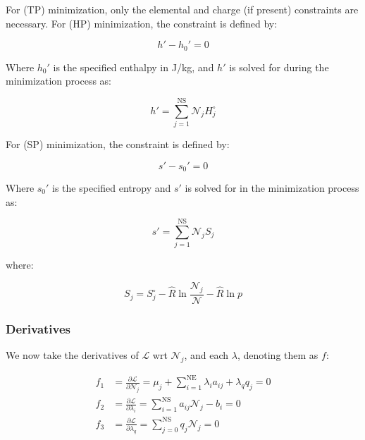 \documentclass[10pt]{article}
\begin{document}
\begin{flushleft}
For (TP) minimization, only the elemental and charge (if present) constraints are necessary. For (HP) minimization, the constraint is defined by:

\begin{equation}
    h' - h_0' = 0
\end{equation}

Where $h_0'$ is the specified enthalpy in J/kg, and $h'$ is solved for during the minimization process as:

\begin{equation}
    h' = \sum_{j=1}^\text{NS} \mathcal{N}_j H_j^\circ
\end{equation}

For (SP) minimization, the constraint is defined by:

\begin{equation}
    s' - s_0' = 0
\end{equation}

Where $s_0'$ is the specified entropy and $s'$ is solved for in the minimization process as:

\begin{equation}
    s' = \sum_{j=1}^\text{NS} \mathcal{N}_j S_j
\end{equation}

where:

\begin{equation}
    S_j = S_j^\circ - \hat{R} \ln \frac{\mathcal{N}_j}{\mathcal{N}} - \hat{R} \ln p
\end{equation}

\subsubsection{Derivatives}

We now take the derivatives of $\mathcal{L}$ wrt $\mathcal{N}_j$, and each $\lambda$, denoting them as $f$:

\begin{align}
    f_1 &= \frac{\partial \mathcal{L}}{\partial \mathcal{N}_j} = \mu_j + \sum_{i=1}^\text{NE}\lambda_i a_{ij} + \lambda_q q_j = 0
    \label{f1}
    \\ f_2 &= \frac{\partial \mathcal{L}}{\partial \lambda_i} =  \sum_{i=1}^\text{NS} a_{ij} \mathcal{N}_j - b_i = 0
    \label{f2}
    \\ f_3 &= \frac{\partial \mathcal{L}}{\partial \lambda_q} = \sum_{j=0}^\text{NS}q_j\mathcal{N}_j = 0
    \label{f3}
\end{align}


\end{flushleft}
\end{document}
